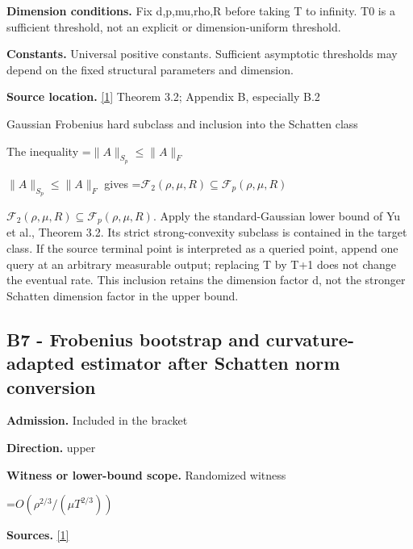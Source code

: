 \documentclass[10pt,a4paper]{article}
\newcommand{\AtlasMath}[1]{\par\begingroup\centering\setbox0=\hbox{$\displaystyle #1$}\ifdim\wd0>1.4\linewidth\typeout{ATLAS WIDE FORMULA: \the\wd0}\fi\ifdim\wd0>\linewidth\resizebox{\linewidth}{!}{\box0}\else\box0\fi\par\endgroup}
\newcommand{\AtlasInlineMath}[1]{\begingroup\setbox0=\hbox{$#1$}\ifdim\wd0>.4\linewidth\endgroup\AtlasMath{#1}\else\endgroup$#1$\fi}
\begin{document}
\textbf{Dimension conditions.} Fix d,p,mu,rho,R before taking T to infinity. T0 is a sufficient threshold, not an explicit or dimension-uniform threshold.



\textbf{Constants.} Universal positive constants. Sufficient asymptotic thresholds may depend on the fixed structural parameters and dimension.



\textbf{Source location.} \href{https://papers.nips.cc/paper_files/paper/2024/file/b444ad72520a5f5c467343be88e352ed-Paper-Conference.pdf}{[1]} Theorem 3.2; Appendix B, especially B.2



Gaussian Frobenius hard subclass and inclusion into the Schatten class



The inequality \AtlasInlineMath{\|A\|_{S_p}\le\|A\|_F} gives \AtlasInlineMath{\mathcal F_2(\rho,\mu,R)\subseteq\mathcal F_p(\rho,\mu,R)}. Apply the standard-Gaussian lower bound of Yu et al., Theorem 3.2. Its strict strong-convexity subclass is contained in the target class. If the source terminal point is interpreted as a queried point, append one query at an arbitrary measurable output; replacing T by T+1 does not change the eventual rate. This inclusion retains the dimension factor d, not the stronger Schatten dimension factor in the upper bound.



\subsection{B7 - Frobenius bootstrap and curvature-adapted estimator after Schatten norm conversion}


\textbf{Admission.} Included in the bracket



\textbf{Direction.} upper



\textbf{Witness or lower-bound scope.} Randomized witness



\AtlasMath{O(\rho^{2/3}/(\mu T^{2/3}))}


\textbf{Sources.} \href{https://papers.nips.cc/paper_files/paper/2024/file/b444ad72520a5f5c467343be88e352ed-Paper-Conference.pdf}{[1]}
\end{document}
